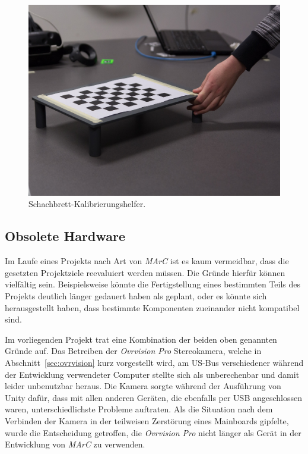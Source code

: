 	\begin{figure}[H] 
	\center 
	\includegraphics[trim = 0mm 20mm 30mm 30mm, clip]{Bilder/Eigene Fotos/IMG_0004.jpg}			
	\caption{Schachbrett-Kalibrierungshelfer.}
	\label{fig:schachbrettKalib}
\end{figure}

	
\subsection{Obsolete Hardware}\label{sec:obsoleteHardware}
Im Laufe eines Projekts nach Art von \emph{MArC} ist es kaum vermeidbar, dass die gesetzten Projektziele reevaluiert werden müssen. Die Gründe hierfür können vielfältig sein. Beispielsweise könnte die Fertigstellung eines bestimmten Teils des Projekts deutlich länger gedauert haben als geplant, oder es könnte sich herausgestellt haben, dass bestimmte Komponenten zueinander nicht kompatibel sind.

Im vorliegenden Projekt trat eine Kombination der beiden oben genannten Gründe auf. Das Betreiben der \emph{Ovrvision Pro} Stereokamera, welche in Abschnitt~\ref{sec:ovrvision} kurz vorgestellt wird, am US-Bus verschiedener während der Entwicklung verwendeter Computer stellte sich als unberechenbar und damit leider unbenutzbar heraus. Die Kamera sorgte während der Ausführung von Unity dafür, dass mit allen anderen Geräten, die ebenfalls per USB angeschlossen waren, unterschiedlichste Probleme auftraten. Als die Situation nach dem Verbinden der Kamera in der teilweisen Zerstörung eines Mainboards gipfelte, wurde die Entscheidung getroffen, die \emph{Ovrvision Pro} nicht länger als Gerät in der Entwicklung von \emph{MArC} zu verwenden.

